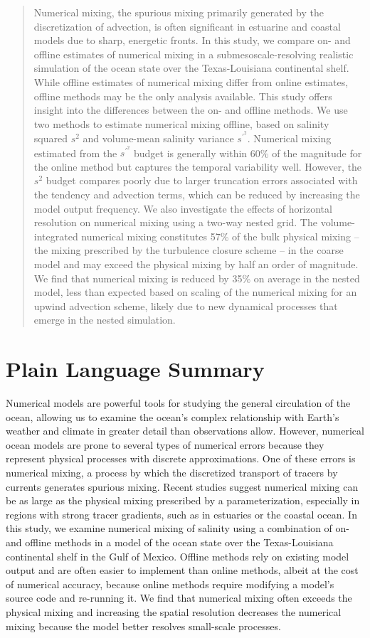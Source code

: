 \documentclass[draft]{agujournal2019}
\begin{document}
\begin{abstract}
Numerical mixing, the spurious mixing primarily generated by the discretization of advection, is often significant in estuarine and coastal models due to sharp, energetic fronts. In this study, we compare on- and offline estimates of numerical mixing in a submesoscale-resolving realistic simulation of the ocean state over the Texas-Louisiana continental shelf. While offline estimates of numerical mixing differ from online estimates, offline methods may be the only analysis available. This study offers insight into the differences between the on- and offline methods. We use two methods to estimate numerical mixing offline, based on salinity squared $s^2$ and volume-mean salinity variance $s^{\prime^2}$. Numerical mixing estimated from the $s^{\prime^2}$ budget is generally within 60\% of the magnitude for the online method but captures the temporal variability well. However, the $s^2$ budget compares poorly due to larger truncation errors associated with the tendency and advection terms, which can be reduced by increasing the model output frequency. We also investigate the effects of horizontal resolution on numerical mixing using a two-way nested grid. The volume-integrated numerical mixing constitutes 57\% of the bulk physical mixing -- the mixing prescribed by the turbulence closure scheme -- in the coarse model and may exceed the physical mixing by half an order of magnitude. We find that numerical mixing is reduced by 35\% on average in the nested model, less than expected based on scaling of the numerical mixing for an upwind advection scheme, likely due to new dynamical processes that emerge in the nested simulation.
\end{abstract}

\section*{Plain Language Summary}
\noindent Numerical models are powerful tools for studying the general circulation of the ocean, allowing us to examine the ocean's complex relationship with Earth's weather and climate in greater detail than observations allow. However, numerical ocean models are prone to several types of numerical errors because they represent physical processes with discrete approximations. One of these errors is numerical mixing, a process by which the discretized transport of tracers by currents generates spurious mixing. Recent studies suggest numerical mixing can be as large as the physical mixing prescribed by a parameterization, especially in regions with strong tracer gradients, such as in estuaries or the coastal ocean. In this study, we examine numerical mixing of salinity using a combination of on- and offline methods in a model of the ocean state over the Texas-Louisiana continental shelf in the Gulf of Mexico. Offline methods rely on existing model output and are often easier to implement than online methods, albeit at the cost of numerical accuracy, because online methods require modifying a model's source code and re-running it. We find that numerical mixing often exceeds the physical mixing and increasing the spatial resolution decreases the numerical mixing because the model better resolves small-scale processes.
\end{document}
